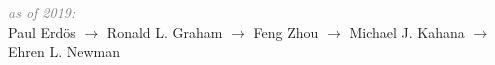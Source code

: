 \documentclass[10pt]{article}
\renewcommand\emph[1]{#1}
\renewcommand{\section}[1]{\pagebreak[3]%
    \vspace{1.3\baselineskip}%
    \phantomsection\addcontentsline{toc}{section}{#1}%
    \noindent\llap{\scshape\smash{\parbox[t]{\marginparwidth}{\hyphenpenalty=10000\raggedright #1}}}%
    \vspace{-\baselineskip}\par}
\begin{document}
\textit{\textcolor{grey}{as of 2019:}}\\
Paul Erdös $\rightarrow$ Ronald L. Graham $\rightarrow$ Feng Zhou $\rightarrow$ Michael J. Kahana $\rightarrow$ Ehren L. Newman\\




%
%
%
%
%
%
%
%
\end{document}
